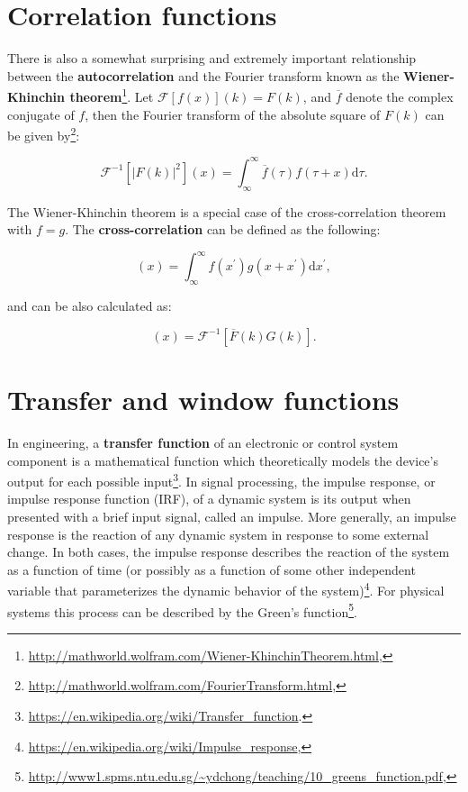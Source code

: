 \documentclass[12pt]{article}
\theoremstyle{plain}
\begin{document}
\section{Correlation functions}

There is also a somewhat surprising and extremely important relationship between the \textbf{autocorrelation} and the Fourier transform known as the \textbf{Wiener-Khinchin theorem}\footnote{\url{http://mathworld.wolfram.com/Wiener-KhinchinTheorem.html},}. Let $\mathcal{F}[f(x)](k) = F(k)$, and $\overline{f}$ denote the complex conjugate of $f$, then the Fourier transform of the absolute square of $F(k)$ can be given by\footnote{\url{http://mathworld.wolfram.com/FourierTransform.html},}:

\begin{equation}
\mathcal{F}^{-1} [ |F(k)|^2 ](x) = \int_{\infty}^{\infty} \overline{f}(\tau) f(\tau + x) \text{d} \tau.
\end{equation}

The Wiener-Khinchin theorem is a special case of the cross-correlation theorem with $f=g$. The \textbf{cross-correlation} can be defined as the following:

\begin{equation}
[f \bullet g](x) = \int_{\infty}^{\infty} f(x^{\prime}) g( x + x^{\prime} ) \text{d}x^{\prime},
\end{equation}

and can be also calculated as:

\begin{equation}
[f \bullet g](x) = \mathcal{F}^{-1} [ \overline{F}(k) G(k) ].
\end{equation}

\section{Transfer and window functions}

In engineering, a \textbf{transfer function} of an electronic or control system component is a mathematical function which theoretically models the device's output for each possible input\footnote{\url{https://en.wikipedia.org/wiki/Transfer_function}.}. In signal processing, the impulse response, or impulse response function (IRF), of a dynamic system is its output when presented with a brief input signal, called an impulse. More generally, an impulse response is the reaction of any dynamic system in response to some external change. In both cases, the impulse response describes the reaction of the system as a function of time (or possibly as a function of some other independent variable that parameterizes the dynamic behavior of the system)\footnote{\url{https://en.wikipedia.org/wiki/Impulse_response},}. For physical systems this process can be described by the Green's function\footnote{\url{http://www1.spms.ntu.edu.sg/~ydchong/teaching/10_greens_function.pdf},}.
\end{document}
